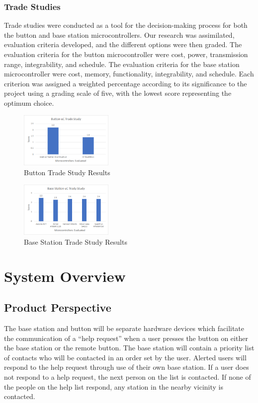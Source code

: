 \documentclass[journal,compsoc]{IEEEtran}
\begin{document}
\subsubsection{Trade Studies}
Trade studies were conducted as a tool for the decision-making process for both the button and base station microcontrollers.  Our research was assimilated, evaluation criteria developed, and the different options were then graded. The evaluation criteria for the button microcontroller were cost, power, transmission range, integrability, and schedule.  The evaluation criteria for the base station microcontroller were cost, memory, functionality, integrability, and schedule.  Each criterion was assigned a weighted percentage according to its significance to the project using a grading scale of five, with the lowest score representing the optimum choice.

\begin{figure}[ht] 	%
\centering
\includegraphics[width=0.4\textwidth]{ButtonTS.png}
\caption{ \space Button Trade Study Results}
\label{HaHa Button TS}
\end{figure}

\begin{figure}[ht] 	%
\centering
\includegraphics[width=0.4\textwidth]{BaseTS.png}
\caption{ \space Base Station Trade Study Results}
\label{HaHa Base TS}
\end{figure}

\section{System Overview}

\subsection{Product Perspective}
The base station and button will be separate hardware devices which facilitate the communication of a “help request” when a user presses the button on either the base station or the remote button. The base station will contain a priority list of contacts who will be contacted in an order set by the user. Alerted users will respond to the help request through use of their own base station.  If a user does not respond to a help request, the next person on the list is contacted. If none of the people on the help list respond, any station in the nearby vicinity is contacted.
\end{document}
